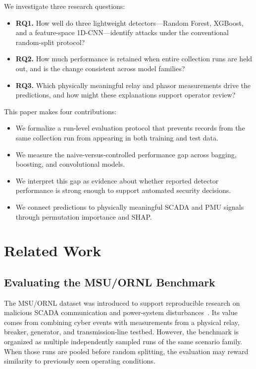 \documentclass[conference,a4paper]{IEEEtran}
\begin{document}
We investigate three research questions:

\begin{itemize}
\item \textbf{RQ1.} How well do three lightweight detectors---Random Forest, XGBoost, and a feature-space 1D-CNN---identify attacks under the conventional random-split protocol?
\item \textbf{RQ2.} How much performance is retained when entire collection runs are held out, and is the change consistent across model families?
\item \textbf{RQ3.} Which physically meaningful relay and phasor measurements drive the predictions, and how might these explanations support operator review?
\end{itemize}

This paper makes four contributions:
\begin{itemize}
\item We formalize a run-level evaluation protocol that prevents records from the same collection run from appearing in both training and test data.
\item We measure the naive-versus-controlled performance gap across bagging, boosting, and convolutional models.
\item We interpret this gap as evidence about whether reported detector performance is strong enough to support automated security decisions.
\item We connect predictions to physically meaningful SCADA and PMU signals through permutation importance and SHAP.
\end{itemize}

\section{Related Work}

\subsection{Evaluating the MSU/ORNL Benchmark}

The MSU/ORNL dataset was introduced to support reproducible research on malicious SCADA communication and power-system disturbances~\cite{beaver2013power,pan2015classification}. Its value comes from combining cyber events with measurements from a physical relay, breaker, generator, and transmission-line testbed. However, the benchmark is organized as multiple independently sampled runs of the same scenario family. When those runs are pooled before random splitting, the evaluation may reward similarity to previously seen operating conditions.
\end{document}
